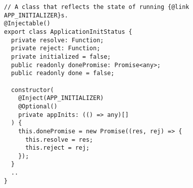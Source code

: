 \begin{verbatim}
// A class that reflects the state of running {@link APP_INITIALIZER}s.
@Injectable()
export class ApplicationInitStatus {
  private resolve: Function;
  private reject: Function;
  private initialized = false;
  public readonly donePromise: Promise<any>;
  public readonly done = false;

  constructor(
    @Inject(APP_INITIALIZER)
    @Optional()
    private appInits: (() => any)[]
  ) {
    this.donePromise = new Promise((res, rej) => {
      this.resolve = res;
      this.reject = rej;
    });
  }
  ..
}
\end{verbatim}
